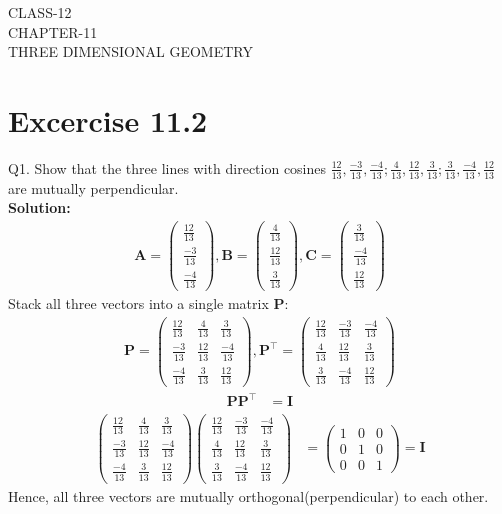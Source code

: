 \documentclass[12pt]{article}
\newcommand{\solution}{\noindent \textbf{Solution: }}
\newcommand{\myvec}[1]{\ensuremath{\begin{pmatrix}#1\end{pmatrix}}}
\let\vec\mathbf
\begin{document}
\begin{center}
\textbf\large{CLASS-12 \\ CHAPTER-11 \\ THREE DIMENSIONAL GEOMETRY}
\end{center}
\section*{Excercise 11.2}

Q1. Show that the three lines with direction cosines $\frac{12}{13}, \frac{-3}{13}, \frac{-4}{13}; \frac{4}{13}, \frac{12}{13}, \frac{3}{13}; \frac{3}{13}, \frac{-4}{13}, \frac{12}{13}$ are mutually perpendicular.
\\
\solution
		\begin{align}
			\vec{A}=\myvec{\frac{12}{13}\\[2pt]\frac{-3}{13}\\[2pt]\frac{-4}{13}},\vec{B}=\myvec{\frac{4}{13}\\[2pt]\frac{12}{13}\\[2pt]\frac{3}{13}},\vec{C}=\myvec{\frac{3}{13}\\[2pt]\frac{-4}{13}\\[2pt]\frac{12}{13}}
		\end{align}
		Stack all three vectors into a single matrix $\vec{P}$:
			\begin{align}
		\vec{P}=\myvec{\frac{12}{13}&\frac{4}{13}    &\frac{3}{13}\\[2pt] \frac{-3}{13}&\frac{12}{13}&\frac{-4}{13}\\[2pt] \frac{-4}{13}&\frac{3}{13}&\frac{12}{13}}, \vec{P}^\top=\myvec{\frac{12}{13}&\frac{-3}{13}   &\frac{-4}{13}\\[2pt] \frac{4}{13}&\frac{12}{13}&\frac{3}{13}\\[2pt] \frac{3}{13}&\frac{-4}{13}&\frac{12}{13}}
			\end{align}
			\begin{align}
	\vec{P}\vec{P}^\top&=\vec{I}
			\end{align}				\begin{align}
				\myvec{\frac{12}{13}&\frac{4}{13}    &\frac{3}{13}\\[2pt] \frac{-3}{13}&\frac{12}{13}&\frac{-4}{13}\\[2pt] \frac{-4}{13}&\frac{3}{13}&\frac{12}{13}}\myvec{\frac{12}{13}&\frac{-3}{13}   &\frac{-4}{13}\\[2pt] \frac{4}{13}&\frac{12}{13}&\frac{3}{13}\\[2pt] \frac{3}{13}&\frac{-4}{13}&\frac{12}{13}}&=\myvec{1&0&0\\[2pt]0&1&0\\[2pt]0&0&1}=\vec{I}
		\end{align}
		Hence, all three vectors are mutually orthogonal(perpendicular) to each other.
\end{document}
